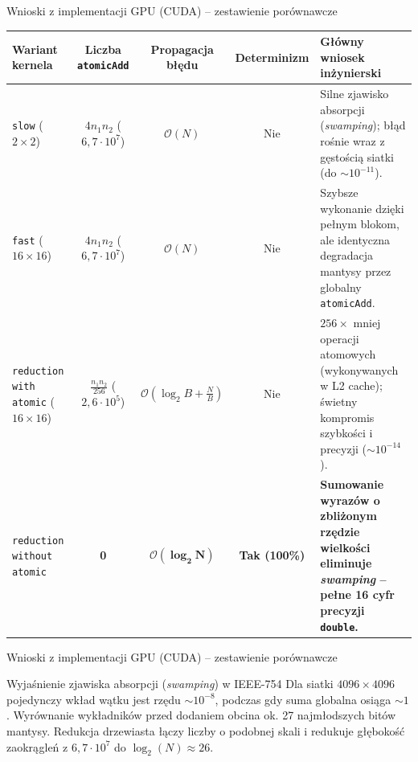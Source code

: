 \documentclass[aspectratio=169, 10pt, xcolor={table}]{beamer}
\begin{document}
\begin{frame}{Wnioski z implementacji GPU (CUDA) -- zestawienie porównawcze}
\begin{table}
  \centering
  \footnotesize
  \setlength{\tabcolsep}{3.5pt}
  \begin{tabular}{@{} >{\raggedright\arraybackslash}p{2.2cm} c c c >{\raggedright\arraybackslash}p{4.1cm} @{}}
    \toprule
    \textbf{Wariant kernela} & \textbf{Liczba \texttt{atomicAdd}} & \textbf{Propagacja błędu} & \textbf{Determinizm} & \textbf{Główny wniosek inżynierski} \\
    \midrule
    \texttt{slow} ($2\times 2$) & $4 n_1 n_2$ ($6{,}7 \cdot 10^7$) & $\mathcal{O}(N)$ & Nie & Silne zjawisko absorpcji (\textit{swamping}); błąd rośnie wraz z gęstością siatki (do $\sim 10^{-11}$). \\
    \midrule
    \texttt{fast} ($16\times 16$) & $4 n_1 n_2$ ($6{,}7 \cdot 10^7$) & $\mathcal{O}(N)$ & Nie & Szybsze wykonanie dzięki pełnym blokom, ale identyczna degradacja mantysy przez globalny \texttt{atomicAdd}. \\
    \midrule
    \texttt{reduction with atomic} ($16\times 16$) & $\frac{n_1 n_2}{256}$ ($2{,}6 \cdot 10^5$) & $\mathcal{O}(\log_2 B + \frac{N}{B})$ & Nie & $256\times$ mniej operacji atomowych (wykonywanych w L2 cache); świetny kompromis szybkości i precyzji ($\sim 10^{-14}$). \\
    \midrule
    \rowcolor{RowHighlight}
    \texttt{reduction without atomic} & \textbf{0} & $\mathbf{\mathcal{O}(\log_2 N)}$ & \textbf{Tak (100\%)} & \textbf{Sumowanie wyrazów o zbliżonym rzędzie wielkości eliminuje \textit{swamping} -- pełne 16 cyfr precyzji \texttt{double}.} \\
    \bottomrule
  \end{tabular}
\end{table}
\end{frame}
\begin{frame}{Wnioski z implementacji GPU (CUDA) -- zestawienie porównawcze}
  \vspace{0.15cm}
  \begin{block}{Wyjaśnienie zjawiska absorpcji (\textit{swamping}) w IEEE-754}
    Dla siatki $4096 \times 4096$ pojedynczy wkład wątku jest rzędu $\sim 10^{-8}$, podczas gdy suma globalna osiąga $\sim 1$. Wyrównanie wykładników przed dodaniem obcina ok. 27 najmłodszych bitów mantysy. Redukcja drzewiasta łączy liczby o podobnej skali i redukuje głębokość zaokrągleń z $6{,}7 \cdot 10^7$ do $\log_2(N) \approx 26$.
  \end{block}
\end{frame}
\end{document}
